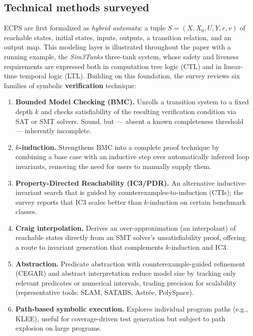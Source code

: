 \documentclass[12pt,a4paper]{article}
\begin{document}
\subsection{Technical methods surveyed}

ECPS are first formalized as \emph{hybrid automata}: a tuple $S=(X,X_0,U,Y,r,v)$ of reachable
states, initial states, inputs, outputs, a transition relation, and an output map. This
modeling layer is illustrated throughout the paper with a running example, the \emph{Sim3Tanks}
three-tank system, whose safety and liveness requirements are expressed both in computation
tree logic (CTL) and in linear-time temporal logic (LTL). Building on this foundation, the
survey reviews six families of symbolic \textbf{verification} technique:

\begin{enumerate}[leftmargin=1.8cm]
  \item \textbf{Bounded Model Checking (BMC).} Unrolls a transition system to a fixed depth $k$
  and checks satisfiability of the resulting verification condition via SAT or SMT solvers.
  Sound, but --- absent a known completeness threshold --- inherently incomplete.
  \item \textbf{$k$-induction.} Strengthens BMC into a complete proof technique by combining a
  base case with an inductive step over automatically inferred loop invariants, removing the
  need for users to manually supply them.
  \item \textbf{Property-Directed Reachability (IC3/PDR).} An alternative inductive-invariant
  search that is guided by counterexamples-to-induction (CTIs); the survey reports that IC3
  scales better than $k$-induction on certain benchmark classes.
  \item \textbf{Craig interpolation.} Derives an over-approximation (an interpolant) of
  reachable states directly from an SMT solver's unsatisfiability proof, offering a route to
  invariant generation that complements $k$-induction and IC3.
  \item \textbf{Abstraction.} Predicate abstraction with counterexample-guided refinement
  (CEGAR) and abstract interpretation reduce model size by tracking only relevant predicates or
  numerical intervals, trading precision for scalability (representative tools: SLAM, SATABS,
  Astr\'ee, PolySpace).
  \item \textbf{Path-based symbolic execution.} Explores individual program paths (e.g., KLEE),
  useful for coverage-driven test generation but subject to path explosion on large programs.
\end{enumerate}
\end{document}
